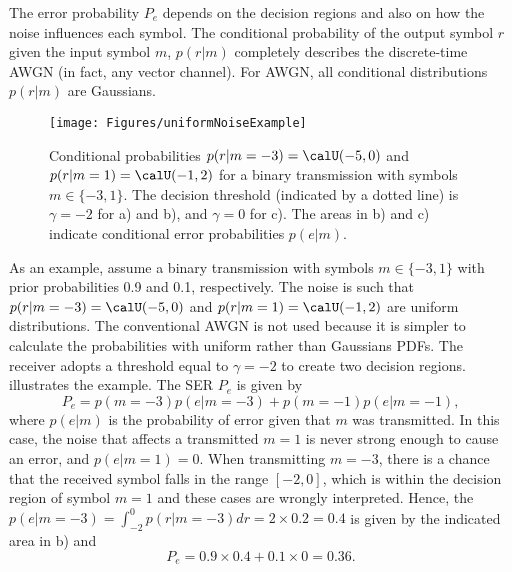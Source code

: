 
The error probability $P_e$ depends on the decision regions and also on how the noise influences each symbol.
The conditional probability of the output symbol $r$ given the input symbol $m$, $p(r|m)$ completely describes the discrete-time AWGN (in fact, any vector channel). For AWGN, all conditional distributions $p(r|m)$ are Gaussians. 

\begin{figure}[htbp]
\centering
\texttt{[image: Figures/uniformNoiseExample]}
\caption[{Conditional probabilities $p(r|m=-3) = \calU(-5,0)$ and $p(r|m=1) = \calU(-1,2)$ for a binary transmission with symbols $m \in \{-3, 1\}$.}]{Conditional probabilities $p(r|m=-3) = \calU(-5,0)$ and $p(r|m=1) = \calU(-1,2)$ for a binary transmission with symbols $m \in \{-3, 1\}$. The decision threshold (indicated by a dotted line) is $\gamma = -2$ for a) and b), and $\gamma=0$ for c). The areas in b) and c) indicate conditional error probabilities $p(e|m)$.\label{fig:uniformNoiseExample}}
\end{figure}

As an example, assume a binary transmission with symbols $m \in \{-3, 1\}$ with prior probabilities 0.9 and 0.1, respectively.  The noise is such that $p(r|m=-3) = \calU(-5,0)$ and $p(r|m=1) = \calU(-1,2)$ are uniform distributions. The conventional AWGN is not used because it is simpler to calculate the probabilities with uniform rather than Gaussians PDFs. The receiver adopts a threshold equal to $\gamma = -2$ to create two decision regions. 
 illustrates the example. The SER $P_e$ is given by
\[
P_e = p(m=-3) p(e|m=-3) + p(m=-1) p(e|m=-1),
\]
where $p(e|m)$ is the probability of error given that $m$ was transmitted. In this case, the noise that affects a transmitted $m=1$ is never strong enough to cause an error, and $p(e|m=1)=0$. When transmitting $m=-3$, there is a chance that the received symbol falls in the range $[-2, 0]$, which is within the decision region of symbol $m=1$ and these cases are wrongly interpreted. Hence, the $p(e|m=-3) = \int_{-2}^0 p(r|m=-3) dr = 2 \times 0.2 = 0.4$ is given by the indicated area in  b) and 
\[
P_e = 0.9 \times 0.4 + 0.1 \times 0 = 0.36.
\]

